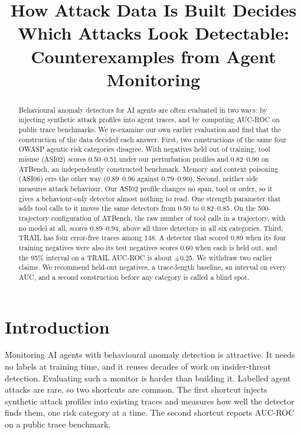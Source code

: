 \documentclass[conference]{IEEEtran}
\begin{document}
\title{How Attack Data Is Built Decides Which Attacks Look Detectable: Counterexamples from Agent Monitoring}

\author{
}

\maketitle

\begin{abstract}
Behavioural anomaly detectors for AI agents are often evaluated in two ways: by injecting synthetic attack profiles into agent traces, and by computing AUC-ROC on public trace benchmarks. We re-examine our own earlier evaluation and find that the construction of the data decided each answer. First, two constructions of the same four OWASP agentic risk categories disagree. With negatives held out of training, tool misuse (ASI02) scores 0.50--0.51 under our perturbation profiles and 0.82--0.90 on ATBench, an independently constructed benchmark. Memory and context poisoning (ASI06) errs the other way (0.89--0.96 against 0.79--0.90). Second, neither side measures attack behaviour. Our ASI02 profile changes no span, tool or order, so it gives a behaviour-only detector almost nothing to read. One strength parameter that adds tool calls to it moves the same detectors from 0.50 to 0.82--0.85. On the 500-trajectory configuration of ATBench, the raw number of tool calls in a trajectory, with no model at all, scores 0.89--0.94, above all three detectors in all six categories. Third, TRAIL has four error-free traces among 148. A detector that scored 0.89 when its four training negatives were also its test negatives scores 0.60 when each is held out, and the 95\% interval on a TRAIL AUC-ROC is about $\pm$0.25. We withdraw two earlier claims. We recommend held-out negatives, a trace-length baseline, an interval on every AUC, and a second construction before any category is called a blind spot.
\end{abstract}

\section{Introduction}

Monitoring AI agents with behavioural anomaly detection is attractive. It needs no labels at training time, and it reuses decades of work on insider-threat detection. Evaluating such a monitor is harder than building it. Labelled agent attacks are rare, so two shortcuts are common. The first shortcut injects synthetic attack profiles into existing traces and measures how well the detector finds them, one risk category at a time. The second shortcut reports AUC-ROC on a public trace benchmark.
\end{document}
